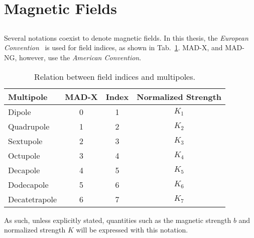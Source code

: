 \section{Magnetic Fields}

\subsection{}

Several notations coexist to denote magnetic fields. In this thesis, the
\textit{European Convention}~\cite{dilly_corrections_2022} is used for field indices, as shown
in Tab.~\ref{tab:magnetic_fields:relation_indices}. MAD-X, and MAD-NG, however, use the
\textit{American Convention}.

\begin{table}[H]
    \centering
    \begin{tabular}{lccc}
    \toprule
        Multipole     &      MAD-X        &     Index        & Normalized Strength \\
    \midrule
        Dipole        &     0             &     1            & $K_1$   \\       
        Quadrupole    &     1             &     2            & $K_2 $  \\
        Sextupole     &     2             &     3            & $K_3 $  \\
        Octupole      &     3             &     4            & $K_4 $  \\
        Decapole      &     4             &     5            & $K_5 $  \\
        Dodecapole    &     5             &     6            & $K_6 $  \\
        Decatetrapole &     6             &     7            & $K_7 $  \\
    \bottomrule
    \end{tabular}
    \caption{Relation between field indices and multipoles.}
    \label{tab:magnetic_fields:relation_indices}
  \end{table}

As such, unless explicitly stated, quantities such as the magnetic strength $b$ and normalized
strength $K$ will be expressed with this notation. 


